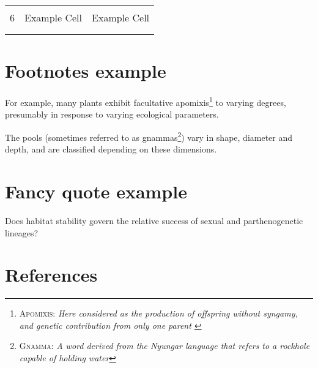 \begin{table}[h]
{\begin{tabular}{@{}llr@{}}
          &                                                 & \multicolumn{1}{l}{}         \\
6         & Example Cell                             & Example Cell                   \\
          &                                                 & \multicolumn{1}{l}{}         \\
          &                                                 &                              \\ \bottomrule
\end{tabular}
}
\end{table}

\lipsum[1-5] %

\section{Footnotes example}

\lipsum[1] %

For example, many plants exhibit facultative apomixis\footnote[1]{\textsc{Apomixis:} \textit{Here considered as the production of offspring without syngamy, and genetic contribution from only one parent \parencite[for comparative terminology between plants and animals see][]{neiman_genetic_2014}}} to varying degrees, presumably in response to varying ecological parameters.

\lipsum[2] %

The pools (sometimes referred to as gnammas\footnote[2]{\textsc{Gnamma:} \textit{A word derived from the Nyungar language that refers to a rockhole capable of holding water}}) vary in shape, diameter and depth, and are classified depending on these dimensions.

\section{Fancy quote example}

\lipsum[1-3] %

\begin{fquote}Does habitat stability govern the relative success of sexual and parthenogenetic lineages? 
\end{fquote}

\section{References}
\sloppy %
\printbibliography[heading=none]
\fussy %

